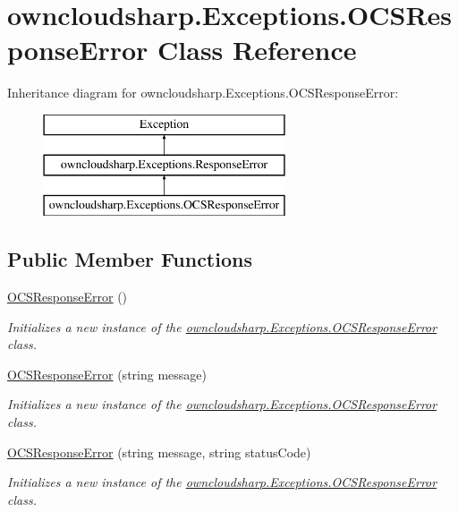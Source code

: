 \hypertarget{classowncloudsharp_1_1_exceptions_1_1_o_c_s_response_error}{}\section{owncloudsharp.\+Exceptions.\+O\+C\+S\+Response\+Error Class Reference}
\label{classowncloudsharp_1_1_exceptions_1_1_o_c_s_response_error}
Inheritance diagram for owncloudsharp.\+Exceptions.\+O\+C\+S\+Response\+Error\+:\begin{figure}[H]
\begin{center}
\leavevmode
\includegraphics[height=3.000000cm]{classowncloudsharp_1_1_exceptions_1_1_o_c_s_response_error}
\end{center}
\end{figure}
\subsection*{Public Member Functions}
\begin{DoxyCompactItemize}
\item 
\hyperlink{classowncloudsharp_1_1_exceptions_1_1_o_c_s_response_error_a4a8be342eabdb1ff56309de41bb27376}{O\+C\+S\+Response\+Error} ()
\begin{DoxyCompactList}\small\item\em Initializes a new instance of the \hyperlink{classowncloudsharp_1_1_exceptions_1_1_o_c_s_response_error}{owncloudsharp.\+Exceptions.\+O\+C\+S\+Response\+Error} class. \end{DoxyCompactList}\item 
\hyperlink{classowncloudsharp_1_1_exceptions_1_1_o_c_s_response_error_abe1faed2e2f100a1d5e5c051413be70a}{O\+C\+S\+Response\+Error} (string message)
\begin{DoxyCompactList}\small\item\em Initializes a new instance of the \hyperlink{classowncloudsharp_1_1_exceptions_1_1_o_c_s_response_error}{owncloudsharp.\+Exceptions.\+O\+C\+S\+Response\+Error} class. \end{DoxyCompactList}\item 
\hyperlink{classowncloudsharp_1_1_exceptions_1_1_o_c_s_response_error_a140bbc4910589e73d076ba7a977b9e88}{O\+C\+S\+Response\+Error} (string message, string status\+Code)
\begin{DoxyCompactList}\small\item\em Initializes a new instance of the \hyperlink{classowncloudsharp_1_1_exceptions_1_1_o_c_s_response_error}{owncloudsharp.\+Exceptions.\+O\+C\+S\+Response\+Error} class. \end{DoxyCompactList}\end{DoxyCompactItemize}
